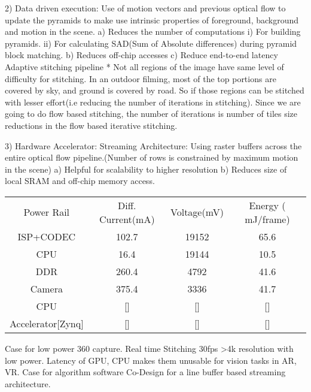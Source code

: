 2) Data driven execution: Use of motion vectors and previous optical flow to update the pyramids to make use intrinsic properties of foreground, background and motion in the scene.
	a) Reduces the number of computations 
		i) For building pyramids.
		ii) For calculating SAD(Sum of Absolute differences) during pyramid block matching.
	b) Reduces off-chip accesses
	c) Reduce end-to-end latency
\newline
Adaptive stitching pipeline *
Not all regions of the image have same level of difficulty for stitching. In an outdoor filming, most of the top portions are covered by sky, and ground is covered by road. So if those regions can be stitched with lesser effort(i.e reducing the number of iterations in stitching). Since we are going to do flow based stitching, the number of iterations is number of tiles size reductions in the flow based iterative stitching. 

3) Hardware Accelerator:
Streaming Architecture: Using raster buffers across the entire optical flow pipeline.(Number of rows is constrained by maximum motion in the scene)
a) Helpful for scalability to higher resolution
b) Reduces size of local SRAM and off-chip memory access.\newline

	\begin{tabular}{c|c|c|c}
	Power Rail & Diff. Current(mA) & Voltage(mV) & Energy ( mJ/frame) \\
	ISP+CODEC & 102.7 & 19152 & 65.6 \\
	CPU & 16.4 & 19144 & 10.5 \\
	DDR & 260.4 & 4792 & 41.6 \\
	Camera & 375.4 & 3336 & 41.7 \\
	CPU & [] & [] & [] \\
	Accelerator[Zynq] & [] & [] & [] \\
\end{tabular} \newline 


Case for low power 360 capture. Real time Stitching 30fps >4k resolution with low power. 
Latency of GPU, CPU makes them unusable for vision tasks in AR, VR.
Case for algorithm software Co-Design for a line buffer based streaming architecture. \newline

